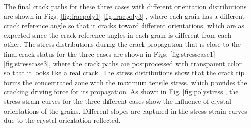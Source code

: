 \documentclass[3p,10pt,sort&compress]{elsarticle}
\begin{document}
The final crack paths for these three cases with different orientation distributions are shown in Figs. \ref{fig:fracpoly1}-\ref{fig:fracpoly3} , where each grain has a different crack reference angle so that it cracks toward different orientations, which are as expected since the crack reference angles in each grain is different from each other. The stress distributions during the crack propagation that is close to the final crack status for the three cases are shown in Figs. \ref{fig:stresscase1}-\ref{fig:stresscase3}, where the crack paths are postprocessed with transparent color so that it looks like a real crack. The stress distributions show that the crack tip forms the concentrated zone with the maximum tensile stress, which provides the cracking driving force for its propagation. As shown in Fig. \ref{fig:polystress}, the stress strain curves for the three different cases show the influence of crystal orientations of the grains. Different slopes are captured in the stress strain curves due to the crystal orientation reflected.
\end{document}
